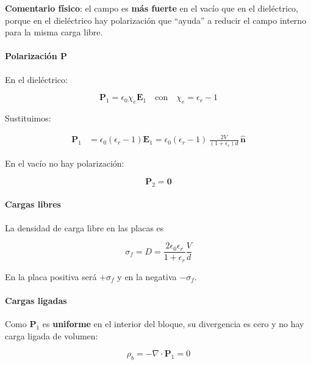 \documentclass{article}
\begin{document}
\textbf{Comentario físico}: el campo es \textbf{más fuerte} en el vacío que en el dieléctrico, porque en el dieléctrico hay polarización que “ayuda” a reducir el campo interno para la misma carga libre.

\paragraph{Polarización $\mathbf{P}$}

En el dieléctrico:

\[
\mathbf{P}_{1} = \epsilon_{0}\chi_{e}\mathbf{E}_{1}
\quad\text{con}\quad
\chi_{e} = \epsilon_{r}-1
\]

Sustituimos:

\begin{align}
\mathbf{P}_{1} 
&= \epsilon_{0}(\epsilon_{r}-1)\mathbf{E}_{1}
= \epsilon_{0}(\epsilon_{r}-1)\,\frac{2V}{(1+\epsilon_{r})d}\,\hat{\mathbf{n}}
\label{eq:P1-a}
\end{align}

En el vacío no hay polarización:

\begin{equation}
\mathbf{P}_{2} = \mathbf{0}
\label{eq:P2-a}
\end{equation}

\paragraph{Cargas libres}

La densidad de carga libre en las placas es

\begin{equation}
\sigma_{f} = D
= \frac{2\epsilon_{0}\epsilon_{r}}{1+\epsilon_{r}}\frac{V}{d}
\label{eq:sigma-f-a}
\end{equation}

En la placa positiva será $+\sigma_{f}$ y en la negativa $-\sigma_{f}$.

\paragraph{Cargas ligadas}

Como $\mathbf{P}_{1}$ es \textbf{uniforme} en el interior del bloque, su divergencia es cero y no hay carga ligada de volumen:

\begin{equation}
\rho_{b} = -\nabla\cdot\mathbf{P}_{1} = 0
\label{eq:rho-b-a}
\end{equation}
\end{document}
